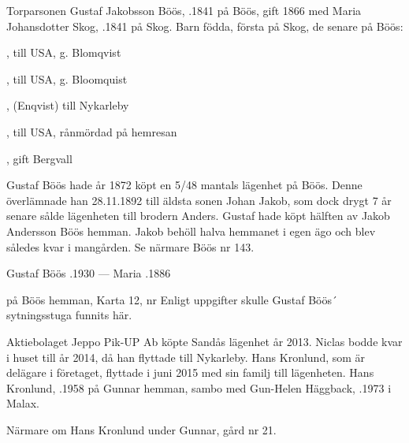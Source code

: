 Torparsonen Gustaf Jakobsson Böös, .1841 på Böös, gift 1866 med Maria Johansdotter Skog, .1841 på Skog. Barn födda, första på Skog, de senare på Böös:
\begin{jhchildren}
  \item {}
  \item {}, till USA, g. Blomqvist
  \item {}
  \item {}
  \item {}, till USA, g. Bloomquist
  \item {}, (Enqvist) till Nykarleby
  \item {}, till USA, rånmördad på hemresan
  \item {}, gift Bergvall
\end{jhchildren}
Gustaf Böös	 hade år 1872 köpt en 5/48 mantals lägenhet på Böös. Denne överlämnade han 28.11.1892 till äldsta sonen Johan Jakob, som dock drygt 7 år senare sålde lägenheten till brodern Anders. Gustaf hade köpt hälften av Jakob Andersson Böös hemman. Jakob behöll halva hemmanet i egen ägo och blev således kvar i mangården. Se närmare Böös nr 143.

Gustaf Böös .1930  ---  Maria .1886


 på Böös hemman, Karta 12, nr 
Enligt uppgifter skulle Gustaf Böös´ sytningsstuga funnits här.






Aktiebolaget Jeppo Pik-UP Ab köpte Sandås lägenhet år 2013. Niclas bodde kvar i huset till år 2014, då han flyttade till Nykarleby. Hans Kronlund, som är delägare i företaget, flyttade i juni 2015 med sin familj till lägenheten. Hans Kronlund, .1958 på Gunnar hemman, sambo med Gun-Helen Häggback, .1973 i Malax.
\begin{jhchildren}
  \item {}
  \item {}
  \item {}
\end{jhchildren}
Närmare om Hans Kronlund under Gunnar, gård nr 21.


